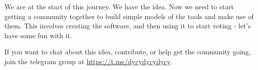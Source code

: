 \documentclass[twoside]{article}
\theoremstyle{definition}
\begin{document}
We are at the start of this journey. We have the idea. Now we need to start getting a community together to build simple models of the tools and make use of them. This involves creating the software, and then using it to start voting - let’s have some fun with it.

If you want to chat about this idea, contribute, or help get the community going, join the telegram group at \url{https://t.me/dycydycydycy}.
	
	
	
\end{document}
